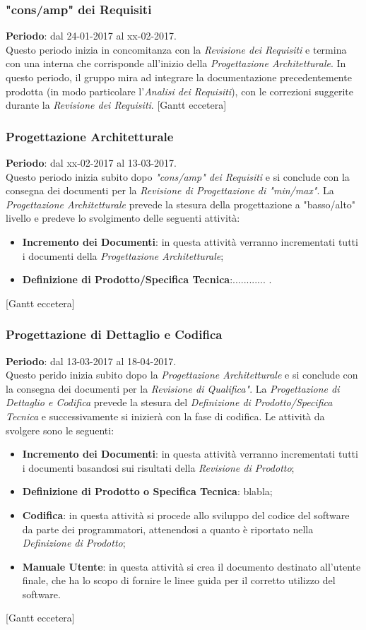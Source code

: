 	\subsubsection{"cons/amp" dei Requisiti}
	\textbf{Periodo}: dal 24-01-2017 al xx-02-2017.
	\\ Questo periodo inizia in concomitanza con la \textit{Revisione dei Requisiti} e termina con una  interna che corrisponde all'inizio
	della \textit{Progettazione Architetturale}. In questo periodo, il gruppo mira ad integrare la documentazione precedentemente prodotta (in modo particolare
	l'\textit{Analisi dei Requisiti}), con le correzioni suggerite durante la \textit{Revisione dei Requisiti}.
	[Gantt eccetera]
	\subsubsection{Progettazione Architetturale}
	\textbf{Periodo}: dal xx-02-2017 al 13-03-2017.	
	\\ Questo periodo inizia subito dopo \textit{"cons/amp" dei Requisiti} e si conclude con la consegna dei documenti per la 
	\textit{Revisione di Progettazione di "min/max"}.
	La \textit{Progettazione Architetturale} prevede la stesura della progettazione a "basso/alto" livello e predeve lo svolgimento delle seguenti attività:
	\begin{itemize}
		\item \textbf{Incremento dei Documenti}: in questa attività verranno incrementati tutti i documenti della \textit{Progettazione Architetturale};
		\item \textbf{Definizione di Prodotto/Specifica Tecnica}:............   .
	\end{itemize}
	[Gantt eccetera]
	\subsubsection{Progettazione di Dettaglio e Codifica}
	\textbf{Periodo}: dal 13-03-2017 al 18-04-2017.	
	\\ Questo perido inizia subito dopo la \textit{Progettazione Architetturale} e si conclude con la consegna dei documenti per la \textit{Revisione di Qualifica"}.
	La \textit{Progettazione di Dettaglio e Codifica} prevede la stesura del \textit{Definizione di Prodotto/Specifica Tecnica} e successivamente si inizierà
	con la fase di codifica.
	Le attività da svolgere sono le seguenti:
	\begin{itemize}
		\item \textbf{Incremento dei Documenti}: in questa attività verranno incrementati tutti i documenti basandosi sui risultati della \textit{Revisione di Prodotto}; 
		\item \textbf{Definizione di Prodotto o Specifica Tecnica}: blabla;
		\item \textbf{Codifica}: in questa attività si procede allo sviluppo del codice del software da parte dei programmatori, attenendosi a quanto è riportato nella \textit{Definizione di Prodotto}; 
		\item \textbf{Manuale Utente}: in questa attività si crea il documento destinato all'utente finale, che ha lo scopo di fornire le linee guida per il corretto utilizzo del software.
	\end{itemize}
	[Gantt eccetera]
